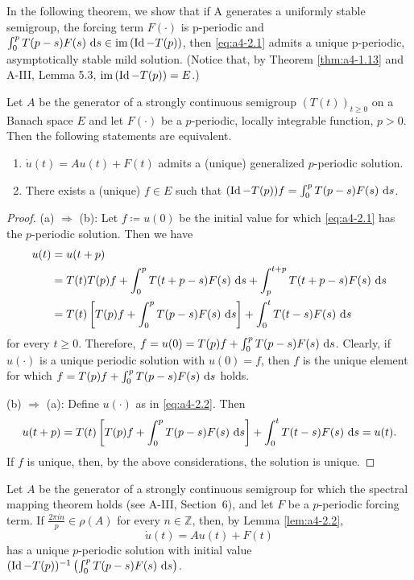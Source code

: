 In the following theorem, we show that if A generates a
uniformly stable semigroup, the forcing term $F(\cdot)$ is p-periodic
and $\int_{0}^{p} T(p-s)F(s) \,\mathop{}\!\mathrm{d}{s} \in \mathop{}\!\mathrm{im}\,(\operatorname{Id} - T(p))$, then \eqref{eq:a4-2.1}
admits a unique p-periodic, asymptotically stable mild solution. (Notice that, by
Theorem \ref{thm:a4-1.13} and A-III, Lemma 5.3, $\mathop{}\!\mathrm{im}\,(\operatorname{Id} - T(p)) = E$.)

\begin{lemma}\label{lem:a4-2.2}
Let $A$ be the generator of a strongly continuous semigroup $(T(t))_{t \geq 0}$ on a Banach space $E$ and let $F(\cdot)$ be a $p$-periodic, locally integrable function, $p > 0$. 
Then the following statements are equivalent.
\begin{enumerate}[\upshape (a)]
\item 
$\dot{u}(t) = Au(t) + F(t)$ admits a (unique) generalized $p$-periodic solution.

\item 
There exists a (unique) $f \in E$ such that $(\operatorname{Id} - T(p))f = \int_{0}^{p} T(p-s)F(s) \,\mathop{}\!\mathrm{d}{s}$.
\end{enumerate}
\end{lemma}
\begin{proof}
(a) $\Rightarrow$ (b): 
Let $f \coloneqq u(0)$ be the initial value for which \eqref{eq:a4-2.1} has the $p$-periodic solution. 
Then we have
\begin{align*}
u(t) &= u(t+p) \\
&= T(t)T(p)f + \int_{0}^{p} T(t+p-s)F(s) \,\mathop{}\!\mathrm{d}{s} + \int_{p}^{t+p} T(t+p-s)F(s) \,\mathop{}\!\mathrm{d}{s} \\
&= T(t)\left[T(p)f + \int_{0}^{p} T(p-s)F(s) \,\mathop{}\!\mathrm{d}{s}\right] + \int_{0}^{t} T(t-s)F(s) \,\mathop{}\!\mathrm{d}{s}
\end{align*}
for every $t \geq 0$. 
Therefore, $f = u(0) = T(p)f + \int_{0}^{p} T(p-s)F(s) \,\mathop{}\!\mathrm{d}{s}$.
Clearly, if $u(\cdot)$ is a unique periodic solution with $u(0) = f$, then $f$ is the unique element for which $f = T(p)f + \int_{0}^{p} T(p-s)F(s) \,\mathop{}\!\mathrm{d}{s}$ holds.

(b) $\Rightarrow$ (a):  
Define $u(\cdot)$ as in \eqref{eq:a4-2.2}. 
Then
\begin{align*}
u(t+p) = T(t)\left[T(p)f + \int_{0}^{p} T(p-s)F(s) \,\mathop{}\!\mathrm{d}{s}\right] + \int_{0}^{t} T(t-s)F(s) \,\mathop{}\!\mathrm{d}{s} = u(t).
\end{align*}
If $f$ is unique, then, by the above considerations, the solution is unique.
\end{proof}
\begin{remark}\label{rem:a4-2.3}
Let $A$ be the generator of a strongly continuous semigroup for which the spectral mapping theorem holds (see A-III, Section~6), and let $F$ be a $p$-periodic forcing term.
If $\frac{2\pi in}{p} \in \rho(A)$ for every $n \in \mathbb{Z}$, then, by Lemma \ref{lem:a4-2.2}, 
\[ 
\dot{u}(t) = Au(t) + F(t)
\]
has a unique $p$-periodic solution with initial value $(\operatorname{Id} - T(p))^{-1} \left(\int_{0}^{p} T(p-s)F(s) \,\mathop{}\!\mathrm{d}{s}\right)$.
\end{remark}
